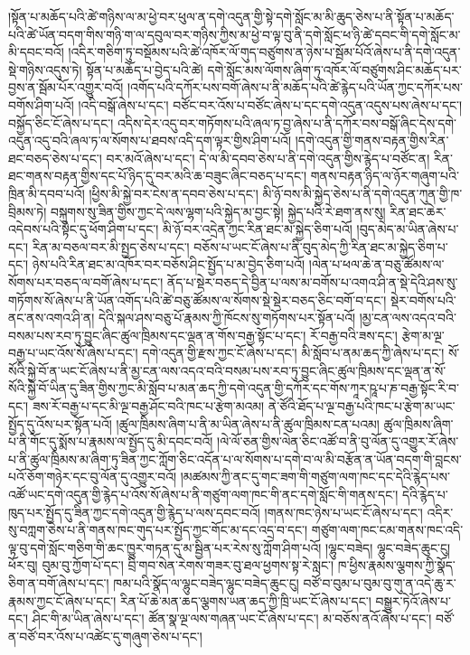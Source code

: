 །སྟོན་པ་མཆོད་པའི་ཚེ་གཉིས་ལ་མ་ཕྱེ་བར་ཕུལ་ན་དགེ་འདུན་གྱི་སྟེ་དགེ་སློང་མ་མི་ཆུད་ཅེས་པ་ནི་སྟོན་པ་མཆོད་པའི་ཚེ་ཡོན་བདག་གིས་གཉི་ག་ལ་དབུལ་བར་གཉིས་ཀྱིས་མ་ཕྱེ་བ་ལྟ་བུ་ནི་དགེ་སློང་ཕ་ཉི་ཚེ་དབང་གི་དགེ་སློང་མ་མི་དབང་བའོ། །འདིར་གཅིག་ཏུ་བསྡོམས་པའི་ཚེ་འཁོར་ལོ་གུད་བཙུགས་ན་ཉེས་པ་སྦོམ་པོའོ་ཞེས་པ་ནི་དགེ་འདུན་སྡེ་གཉིས་འདུས་ཏེ། སྟོན་པ་མཆོད་པ་བྱེད་པའི་ཚེ། དགེ་སློང་མས་ལོགས་ཞིག་ཏུ་འཁོར་ལོ་བཙུགས་ཤིང་མཆོད་པར་བྱས་ན་སྦོམ་པོར་འགྱུར་བའོ། །འགོད་པའི་དཀོར་པས་བགོ་ཞེས་པ་ནི་མཆོད་པའི་ཚེ་རྙེད་པའི་ཡོན་ཀྱང་དཀོར་པས་བགོས་ཤིག་པའོ། །འདི་བསྒོ་ཞེས་པ་དང་། བཙོང་བར་འོས་པ་བཙོང་ཞེས་པ་དང་དགེ་འདུན་འདུས་པས་ཞེས་པ་དང་། བསྐྱོད་ཅིང་ངོ་ཞེས་པ་དང་། འདིས་དེར་འདུ་བར་གཏོགས་པའི་ཞལ་ཏ་བྱ་ཞེས་པ་ནི་དཀོར་བས་བསྒོ་ཞིང་དེས་དགེ་འདུན་འདུ་བའི་ཞལ་ཏ་ལ་སོགས་པ་ཐབས་འདི་དག་ལྟར་གྱིས་ཤིག་པའོ། །དགེ་འདུན་གྱི་གནས་བརྟན་གྱིས་རིན་ཐང་བཅད་ཅེས་པ་དང་། བར་མའོ་ཞེས་པ་དང་། དེ་ལ་མི་དབབ་ཅེས་པ་ནི་དགེ་འདུན་གྱིས་རྙེད་པ་བཙོང་ན། རིན་ཐང་གནས་བརྟན་གྱིས་དང་པོ་ཉིད་དུ་བར་མའི་ཆ་བཟུང་ཞིང་བཅད་པ་དང་། གནས་བརྟན་ཉིད་ལ་ཉོར་གཞུག་པའི་ཁྲིན་མི་དབབ་པའོ། །ཕྱིས་མི་སྐྱེ་བར་ངེས་ན་དབབ་ཅེས་པ་དང་། མི་ཉོ་བས་མི་སྐྱེད་ཅེས་པ་ནི་དགེ་འདུན་ཀུན་གྱི་ཁ་བྲིམས་ཏེ། བསྐུགས་སུ་ཟིན་གྱིས་ཀྱང་དེ་ལས་ལྷག་པའི་སྐྱེད་མ་བྱང་སྟེ། སྐྱེད་པའི་རེ་ཐག་ནས་སུ། རིན་ཐང་ཆེར་འདེབས་པའི་སྟེང་དུ་ཕོག་ཤིག་པ་དང་། མི་ཉོ་བར་འདྲེན་ཀྱང་རིན་ཐང་མ་སྐྱེད་ཅིག་པའོ། །བུད་མེད་མ་ཡིན་ཞེས་པ་དང་། རིན་མ་བཅལ་བར་མི་སྤྱད་ཅེས་པ་དང་། བཅོས་པ་ཡང་ངོ་ཞེས་པ་ནི་བུད་མེད་ཀྱི་རིན་ཐང་མ་སྐྱེད་ཅིག་པ་དང་། ཉེས་པའི་རིན་ཐང་མ་འཁོར་བར་བཅོས་ཤིང་སྤྱོད་པ་མ་བྱེད་ཅིག་པའོ། །ལེན་པ་ཕལ་ཆེ་ན་བཅུ་ཚོམས་ལ་སོགས་པར་བཅད་ལ་བགོ་ཞེས་པ་དང་། ནོད་པ་སྡེར་བཅད་དེ་བྱིན་པ་ལས་མ་བགོས་པ་འགའ་ཤི་ན་སྡེ་དེའི་ཤས་སུ་གཏོགས་སོ་ཞེས་པ་ནི་ཡོན་འགོད་པའི་ཚེ་བཅུ་ཚོམས་ལ་སོགས་སྡེ་སྡེར་བཅད་ཅིང་བགོ་བ་དང་། སྡེར་བགོས་པའི་ནང་ནས་འགའ་ཤི་ན། དེའི་སྐལ་ཤས་བཅུ་པོ་རྣམས་ཀྱི་ཁོངས་སུ་གཏོགས་པར་སྟོན་པའོ། །མྱ་ངན་ལས་འདའ་བའི་བསམ་པས་རབ་ཏུ་བྱུང་ཞིང་ཚུལ་ཁྲིམས་དང་ལྡན་ན་གོས་བརྒྱ་སྟོང་པ་དང་། རོ་བརྒྱ་བའི་ཟས་དང་། རྩེག་མ་ལྔ་བརྒྱ་པ་ཡང་འོས་སོ་ཞེས་པ་དང་། དགེ་འདུན་གྱི་རྫས་ཀྱང་ངོ་ཞེས་པ་དང་། མི་སློབ་པ་ནམ་ཆད་ཀྱི་ཞེས་པ་དང་། སོ་སོའི་སྐྱེ་བོ་ན་ཡང་ངོ་ཞེས་པ་ནི་མྱ་ངན་ལས་འདའ་བའི་བསམ་པས་རབ་ཏུ་བྱུང་ཞིང་ཚུལ་ཁྲིམས་དང་ལྡན་ན་སོ་སོའི་སྐྱེ་བོ་ཡིན་དུ་ཟིན་གྱིས་ཀྱང་མི་སློབ་པ་མན་ཆད་ཀྱི་དགེ་འདུན་གྱི་དཀོར་དང་གོས་ཀཱར་ཥཱ་པ་ཎ་བརྒྱ་སྟོང་རི་བ་དང་། ཟས་རོ་བརྒྱ་པ་དང་མི་ལྔ་བརྒྱ་ཤོང་བའི་ཁང་པ་རྩེག་མའམ། ནེ་ཙོའི་ཐོད་པ་ལྔ་བརྒྱ་པའི་ཁང་པ་རྩེག་མ་ཡང་སྤྱོད་དུ་འོས་པར་སྟོན་པའོ། །ཚུལ་ཁྲིམས་ཞིག་པ་ནི་མ་ཡིན་ཞེས་པ་ནི་ཚུལ་ཁྲིམས་ངན་པའམ། ཚུལ་ཁྲིམས་ཞིག་པ་ནི་གོང་དུ་སྨོས་པ་རྣམས་ལ་སྤྱོད་དུ་མི་དབང་བའོ། །ལེ་ལོ་ཅན་གྱིས་ལེན་ཅིང་འཚོ་བ་ནི་བུ་ལོན་དུ་འགྱུར་རོ་ཞེས་པ་ནི་ཚུལ་ཁྲིམས་མ་ཞིག་ཏུ་ཟིན་ཀྱང་ཀློག་ཅིང་འདོན་པ་ལ་སོགས་པ་དགེ་བ་ལ་མི་བརྩོན་ན་ཡོན་བདག་གི་བླངས་པའོ་ཅོག་གཉེར་དང་བུ་ལོན་དུ་འགྱུར་བའོ། །མཚམས་ཀྱི་ནང་དུ་གང་ཟག་གི་གཙུག་ལག་ཁང་དང་དེའི་རྙེད་པས་འཚོ་ཡང་དགེ་འདུན་གྱི་རྙེད་པ་འོས་སོ་ཞེས་པ་ནི་གཙུག་ལག་ཁང་གི་ནང་དགེ་སློང་གི་གནས་དང་། དེའི་རྙེད་པ་ཁུད་པར་སྤྱོད་དུ་ཟིན་ཀྱང་དགེ་འདུན་གྱི་རྙེད་པ་ལས་དབང་བའོ། །གནས་ཁང་ཉེས་པ་ཡང་ངོ་ཞེས་པ་དང་། འདིར་སུ་བཀླག་ཅེས་པ་ནི་གནས་ཁང་གུད་པར་སྤྱོད་ཀྱང་གོང་མ་དང་འདྲ་བ་དང་། གཙུག་ལག་ཁང་ངམ་གནས་ཁང་འདི་ལྟ་བུ་དགེ་སློང་གཅིག་གི་ཆང་ཁྱུར་གཏན་དུ་མ་སྦྱིན་པར་རེས་སུ་ཀློག་ཤིག་པའོ། །ལྷུང་བཟེད། ལྷུང་བཟེད་ཆུང་ངུ། ཕོར་བུ། བུམ་བུ་ཀྱོག་པོ་དང་། བྲི་གབ་སེན་རེགས་གཟར་བུ་ཐལ་ཕྱགས་སྟ་རེ་སླང་། ཁ་ཕྱིས་རྣམས་ལྕགས་ཀྱི་སྣོད་ཅིག་ན་བགོ་ཞེས་པ་དང་། ཁམ་པའི་སྣོད་ལ་ལྷུང་བཟེད་ལྷུང་བཟེད་ཆུང་ངུ། བཙོ་བ་བུམ་པ་བུམ་བུ་གུ་ན་འདེ་ཆུ་ར་རྣམས་ཀྱང་ངོ་ཞེས་པ་དང་། རིན་པོ་ཆེ་མན་ཆད་ལྕགས་ཡན་ཆད་ཀྱི་ཁྲི་ཡང་ངོ་ཞེས་པ་དང་། བསྒྱུར་ཏེའོ་ཞེས་པ་དང་། ཤིང་གི་མ་ཡིན་ཞེས་པ་དང་། ཚོན་སྣ་ལྔ་ལས་གཞན་ཡང་ངོ་ཞེས་པ་དང་། མ་བཅོས་ནའོ་ཞེས་པ་དང་། བཙོ་ན་བཙོ་བར་འོས་པ་འཚེང་དུ་གཞུག་ཅེས་པ་དང་། 